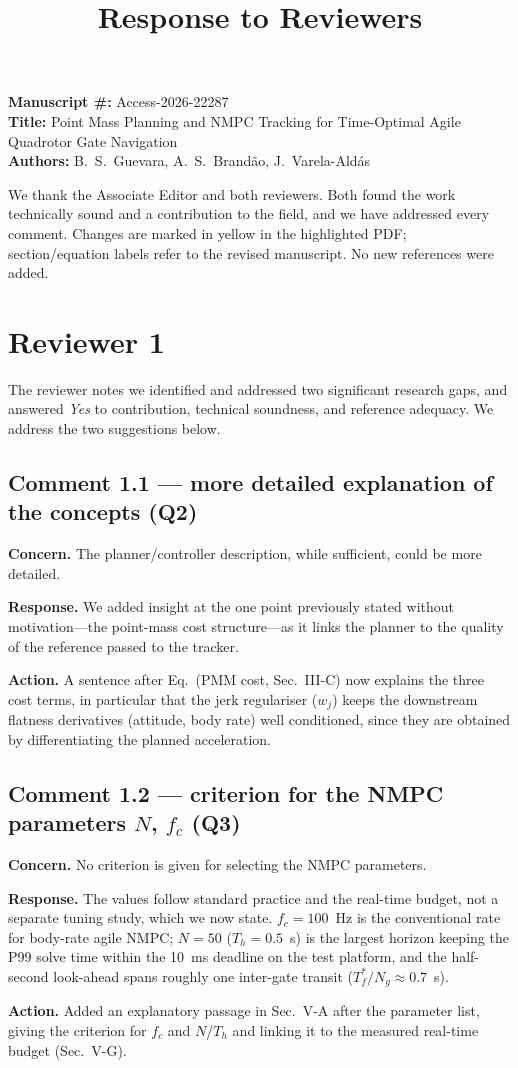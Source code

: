 \documentclass[11pt]{article}
\title{\vspace{-2.5em}Response to Reviewers}
\author{}
\date{}
\newcommand{\concern}[1]{\par\smallskip\textbf{Concern.} #1}
\newcommand{\response}[1]{\par\textbf{Response.} #1}
\newcommand{\action}[1]{\par\textbf{Action.} #1\par\smallskip}
\newcommand{\nmpc}{NMPC}
\begin{document}
\maketitle
\vspace{-3em}

\noindent\textbf{Manuscript \#:} Access-2026-22287\\
\textbf{Title:} Point Mass Planning and \nmpc{} Tracking for Time-Optimal
Agile Quadrotor Gate Navigation\\
\textbf{Authors:} B.\ S.\ Guevara, A.\ S.\ Brand\~ao, J.\ Varela-Ald\'as

\medskip
\noindent We thank the Associate Editor and both reviewers. Both found the
work technically sound and a contribution to the field, and we have
addressed every comment. Changes are marked in yellow in the highlighted
PDF; section/equation labels refer to the revised manuscript. No new
references were added.

\section*{Reviewer 1}
The reviewer notes we identified and addressed two significant research
gaps, and answered \emph{Yes} to contribution, technical soundness, and
reference adequacy. We address the two suggestions below.

\subsection*{Comment 1.1 --- more detailed explanation of the concepts (Q2)}
\concern{The planner/controller description, while sufficient, could be
more detailed.}
\response{We added insight at the one point previously stated without
motivation---the point-mass cost structure---as it links the planner to the
quality of the reference passed to the tracker.}
\action{A sentence after Eq.~(PMM cost, Sec.~III-C) now explains the three
cost terms, in particular that the jerk regulariser ($w_j$) keeps the
downstream flatness derivatives (attitude, body rate) well conditioned,
since they are obtained by differentiating the planned acceleration.}

\subsection*{Comment 1.2 --- criterion for the \nmpc{} parameters $N$, $f_c$ (Q3)}
\concern{No criterion is given for selecting the \nmpc{} parameters.}
\response{The values follow standard practice and the real-time budget, not
a separate tuning study, which we now state. $f_c=100$~Hz is the
conventional rate for body-rate agile \nmpc{}; $N=50$ ($T_h=0.5$~s) is the
largest horizon keeping the P99 solve time within the 10~ms deadline on the
test platform, and the half-second look-ahead spans roughly one inter-gate
transit ($T_f^*/N_g\approx0.7$~s).}
\action{Added an explanatory passage in Sec.~V-A after the parameter list,
giving the criterion for $f_c$ and $N$/$T_h$ and linking it to the measured
real-time budget (Sec.~V-G).}
\end{document}
